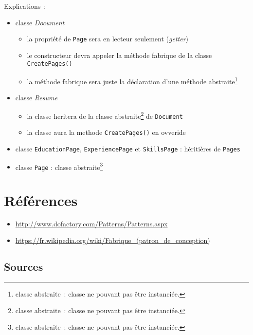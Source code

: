 \documentclass[a4paper,12pt]{article}
\begin{document}
Explications~:
\begin{itemize}

\item classe \textit{Document}
    \begin{itemize}
        \item la propriété de \texttt{Page} sera en lecteur seulement (\emph{getter})
        \item le constructeur devra appeler la méthode fabrique de la classe \texttt{CreatePages()}
        \item la méthode fabrique sera juste la déclaration d'une méthode abstraite\footnote{classe abstraite~: classe ne pouvant pas être instanciée.}
    \end{itemize}
\item classe \textit{Resume} 
    \begin{itemize}
        \item la classe heritera de la classe abstraite\footnote{classe abstraite~: classe ne pouvant pas être instanciée.} de \texttt{Document}
        \item la classe aura la methode \texttt{CreatePages()} en ovveride
    \end{itemize}
\item classe \texttt{EducationPage}, \texttt{ExperiencePage} et \texttt{SkillsPage} : héritières de \texttt{Pages} 
\item classe \texttt{Page} : classe abstraite\footnote{classe abstraite~: classe ne pouvant pas être instanciée.}
\end{itemize}

\section{Références}
\begin{itemize}
\item \url{http://www.dofactory.com/Patterns/Patterns.aspx}
\item \url{https://fr.wikipedia.org/wiki/Fabrique_(patron_de_conception)}
\end{itemize}
\newpage
\subsection{Sources}



\newcommand{\listingPath}{./code}
\newcommand{\lstinputCsharp}[1]{
 {\listingPath/#1.cs}}
\end{document}
